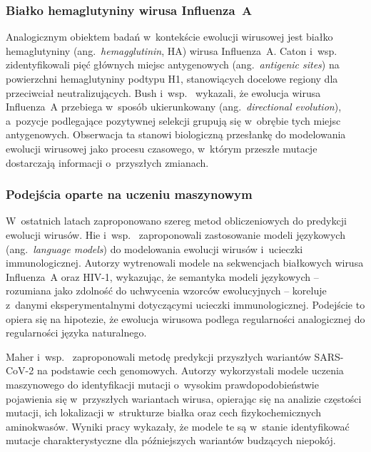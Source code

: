 \subsubsection{Białko hemaglutyniny wirusa Influenza~A}

Analogicznym obiektem badań w~kontekście ewolucji wirusowej jest białko hemaglutyniny (ang.~\textit{hemagglutinin}, HA) wirusa Influenza~A. Caton i~wsp.~\cite{caton1982influenza} zidentyfikowali pięć głównych miejsc antygenowych (ang.~\textit{antigenic sites}) na powierzchni hemaglutyniny podtypu H1, stanowiących docelowe regiony dla przeciwciał neutralizujących. Bush i~wsp.~\cite{bush1999influenza} wykazali, że ewolucja wirusa Influenza~A przebiega w~sposób ukierunkowany (ang.~\textit{directional evolution}), a~pozycje podlegające pozytywnej selekcji grupują się w~obrębie tych miejsc antygenowych. Obserwacja ta stanowi biologiczną przesłankę do modelowania ewolucji wirusowej jako procesu czasowego, w~którym przeszłe mutacje dostarczają informacji o~przyszłych zmianach.

\subsubsection{Podejścia oparte na uczeniu maszynowym}

W~ostatnich latach zaproponowano szereg metod obliczeniowych do predykcji ewolucji wirusów. Hie i~wsp.~\cite{hie2021viral} zaproponowali zastosowanie modeli językowych (ang.~\textit{language models}) do modelowania ewolucji wirusów i~ucieczki immunologicznej. Autorzy wytrenowali modele na sekwencjach białkowych wirusa Influenza~A oraz HIV-1, wykazując, że semantyka modeli językowych -- rozumiana jako zdolność do uchwycenia wzorców ewolucyjnych -- koreluje z~danymi eksperymentalnymi dotyczącymi ucieczki immunologicznej. Podejście to opiera się na hipotezie, że ewolucja wirusowa podlega regularności analogicznej do regularności języka naturalnego.

Maher i~wsp.~\cite{maher2022predicting} zaproponowali metodę predykcji przyszłych wariantów SARS-CoV-2 na podstawie cech genomowych. Autorzy wykorzystali modele uczenia maszynowego do identyfikacji mutacji o~wysokim prawdopodobieństwie pojawienia się w~przyszłych wariantach wirusa, opierając się na analizie częstości mutacji, ich lokalizacji w~strukturze białka oraz cech fizykochemicznych aminokwasów. Wyniki pracy wykazały, że modele te są w~stanie identyfikować mutacje charakterystyczne dla późniejszych wariantów budzących niepokój.

